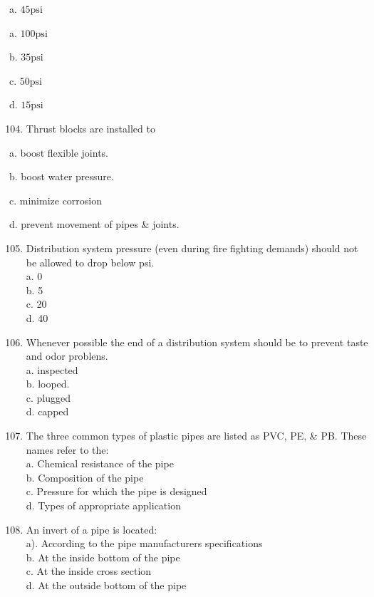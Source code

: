 \documentclass[10pt]{article}
\begin{document}
\begin{enumerate}
\begin{enumerate}
a. $45 \mathrm{psi}$

a. $100 \mathrm{psi}$

b. $35 \mathrm{psi}$

c. $50 \mathrm{psi}$

d. $15 \mathrm{psi}$

\begin{enumerate}
  \setcounter{enumi}{103}
  \item Thrust blocks are installed to
\end{enumerate}

a. boost flexible joints.

b. boost water pressure.

c. minimize corrosion

d. prevent movement of pipes \& joints.

\begin{enumerate}
  \setcounter{enumi}{104}
  \item Distribution system pressure (even during fire fighting demands) should not be allowed to drop below psi.\\
a. 0\\
b. 5\\
c. 20\\
d. 40\\

  \item Whenever possible the end of a distribution system should be to prevent taste and odor problens.\\
a. inspected\\
b. looped.\\
c. plugged\\
d. capped\\

  \item The three common types of plastic pipes are listed as PVC, PE, \& PB. These names refer to the:\\
a. Chemical resistance of the pipe\\
b. Composition of the pipe\\
c. Pressure for which the pipe is designed\\
d. Types of appropriate application\\

  \item An invert of a pipe is located:\\
a). According to the pipe manufacturers specifications\\
b. At the inside bottom of the pipe\\
c. At the inside cross section\\
d. At the outside bottom of the pipe


\end{enumerate}
\end{enumerate}
\end{enumerate}
\end{document}
